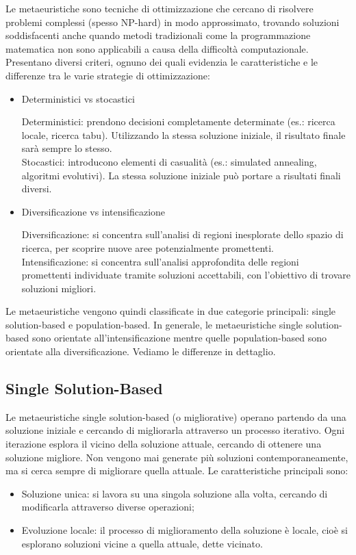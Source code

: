Le metaeuristiche sono tecniche di ottimizzazione che cercano di risolvere problemi complessi (spesso NP-hard) in modo approssimato, trovando soluzioni soddisfacenti anche quando metodi tradizionali come la programmazione matematica non sono applicabili a causa della difficoltà computazionale. Presentano diversi criteri, ognuno dei quali evidenzia le caratteristiche e le differenze tra le varie strategie di ottimizzazione:
\begin{itemize}
    \item Deterministici vs stocastici

    Deterministici: prendono decisioni completamente determinate (es.: ricerca locale, ricerca tabu). Utilizzando la stessa soluzione iniziale, il risultato finale sarà sempre lo stesso. \\
    Stocastici: introducono elementi di casualità (es.: simulated annealing, algoritmi evolutivi). La stessa soluzione iniziale può portare a risultati finali diversi. 
    \item Diversificazione vs intensificazione
    
    Diversificazione: si concentra sull'analisi di regioni inesplorate dello spazio di ricerca, per scoprire nuove aree potenzialmente promettenti.\\
    Intensificazione: si concentra sull'analisi approfondita delle regioni promettenti individuate tramite soluzioni accettabili, con l'obiettivo di trovare soluzioni migliori.
\end{itemize}

Le metaeuristiche vengono quindi classificate in due categorie principali: single solution-based e population-based. In generale, le metaeuristiche single solution-based sono orientate all'intensificazione mentre quelle population-based sono orientate alla diversificazione.
Vediamo le differenze in dettaglio.

\subsection{Single Solution-Based}

Le metaeuristiche single solution-based (o migliorative) operano partendo da una soluzione iniziale e cercando di migliorarla attraverso un processo iterativo. Ogni iterazione esplora il vicino della soluzione attuale, cercando di ottenere una soluzione migliore. Non vengono mai generate più soluzioni contemporaneamente, ma si cerca sempre di migliorare quella attuale. Le caratteristiche principali sono:
\begin{itemize}
    \item Soluzione unica: si lavora su una singola soluzione alla volta, cercando di modificarla attraverso diverse operazioni;
    \item Evoluzione locale: il processo di miglioramento della soluzione è locale, cioè si esplorano soluzioni vicine a quella attuale, dette vicinato.
\end{itemize}

